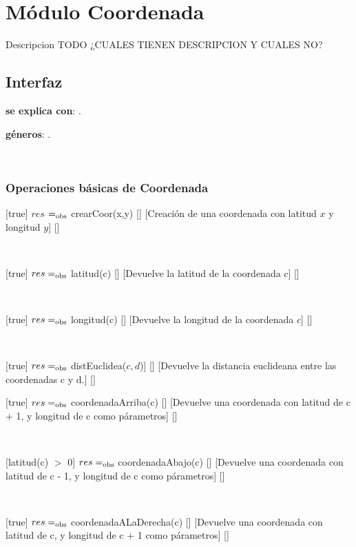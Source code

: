 \section{Módulo Coordenada}

Descripcion TODO ¿CUALES TIENEN DESCRIPCION Y CUALES NO?

\subsection{Interfaz}

\textbf{se explica con}: .

\textbf{géneros}: .

~

\subsubsection{Operaciones básicas de Coordenada}

[true]
{$res$ $=_{\mathrm{obs}}$ crearCoor(x,y)}
[]%
[Creación de una coordenada con latitud $x$ y longitud $y$]
[]

~

[true]
{$res =_{\mathrm{obs}}$ latitud(c)}
[]%
[Devuelve la latitud de la coordenada $c$]
[]

~

[true]
{$res =_{\mathrm{obs}}$ longitud(c)}
[]%
[Devuelve la longitud de la coordenada $c$]
[]

~

[true]
{$res =_{\mathrm{obs}}$ distEuclidea($c, d$)]}
[]%
[Devuelve la distancia euclideana entre las coordenadas c y d.]
[]
~

[true]
{$res =_{\mathrm{obs}}$ coordenadaArriba(c)}
[]%
[Devuelve una coordenada con latitud de c + 1, y longitud de c como párametros]
[]

~

[latitud(c) $>$ 0]
{$res =_{\mathrm{obs}}$ coordenadaAbajo(c)}
[]%
[Devuelve una coordenada con latitud de c - 1, y longitud de c como párametros]
[]

~

[true]
{$res =_{\mathrm{obs}}$ coordenadaALaDerecha(c)}
[]%
[Devuelve una coordenada con latitud de c, y longitud de c + 1 como párametros]
[]

